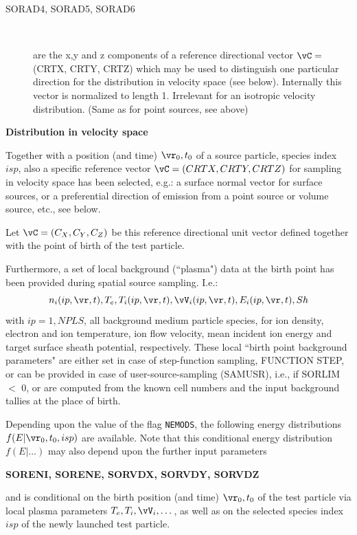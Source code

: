 \begin{description}
  \item[SORAD4, SORAD5, SORAD6] ~ 

        are the x,y and z components of a reference directional vector $\vC =$ (CRTX,
        CRTY, CRTZ) which may be used to distinguish one particular direction for the
        distribution in velocity space (see below).
        Internally this vector is normalized to length 1.
        Irrelevant for an isotropic velocity distribution.
        (Same as for point sources, see above) \
\end{description}

\medskip 

\textbf{Distribution in velocity space} 

\medskip 

Together with a position (and time) $\vr_0,t_0$ of a source particle, species
index $isp$,  also a specific reference vector $\vC = (CRTX,CRTY,CRTZ)$ for
sampling in velocity space has been selected, e.g.: a surface normal vector for
surface sources, or a preferential direction of emission from a point source or
volume source, etc., see below.

Let $\vC = (C_X,C_Y,C_Z)$ be this reference directional unit vector defined
together with the point of birth of the test particle.

Furthermore, a set of local background (``plasma") data at the birth point has
been provided during spatial source sampling.
I.e.:
\begin{equation}
  \label{local-source}
  n_i(ip,\vr,t), T_e, T_i(ip,\vr,t), \vV_i(ip,\vr,t), E_i(ip,\vr,t), Sh
\end{equation}
with $ip=1, NPLS$, all background medium particle species,
for ion density, electron and ion temperature,
ion flow velocity, mean incident ion energy
and target surface sheath potential,
respectively.
These local ``birth point background parameters" are either set in case of
step-function sampling, FUNCTION STEP, or can be provided in case of
user-source-sampling (SAMUSR), i.e., if  SORLIM $<$ 0, or are computed from the
known cell numbers and the input background tallies at the place of birth.

Depending upon the value of the flag \lstinline|NEMODS|, the following
energy distributions $f(E|\vr_0, t_0, isp)$ are available.
Note that this conditional energy distribution $f(E|\dots)$ may also depend
upon the further input parameters 

\textbf{SORENI, SORENE, SORVDX, SORVDY, SORVDZ} 

and is conditional on the birth position (and time) $\vr_0,t_0$ of the test
particle via local plasma parameters $T_e, T_i, \vV_i, \dots$, as well as on
the selected species index $isp$ of the newly launched test particle.

